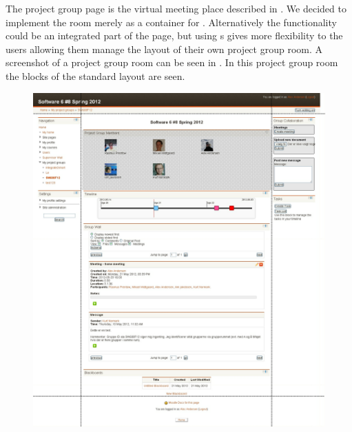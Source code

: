 
The project group page is the virtual meeting place described in .
We decided to implement the room merely as a container for \block{}.
Alternatively the functionality could be an integrated part of the page, but using \block s gives more flexibility to the users allowing them manage the layout of their own project group room. 
A screenshot of a project group room can be seen in . 
In this project group room the blocks of the standard layout are seen.
\begin{figure}[h]
	\centering
		\includegraphics[width=\textwidth]{images/projectgroupnoedit.png}
	\label{fig:projectgroupnoedit}
\end{figure}

